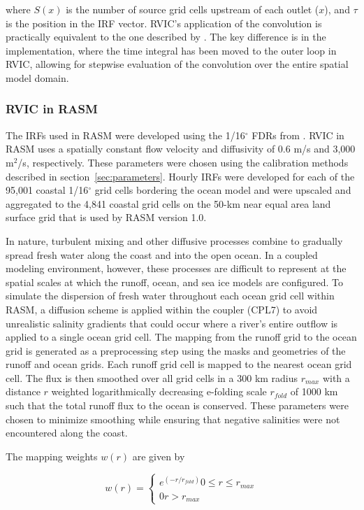 where $S(x)$ is the number of source grid cells upstream of each outlet ($x$), and $\tau$ is the position in the IRF vector.
RVIC's application of the convolution is practically equivalent to the one described by \citet{Lohmann_1996}.
The key difference is in the implementation, where the time integral has been moved to the outer loop in RVIC, allowing for stepwise evaluation of the convolution over the entire spatial model domain.

\subsubsection{RVIC in RASM}

The IRFs used in RASM were developed using the 1/16$^{\circ}$ FDRs from \citet{Wu_2011}.
RVIC in RASM uses a spatially constant flow velocity and diffusivity of 0.6 m/s and 3,000 m$^2$/s, respectively.
These parameters were chosen using the calibration methods described in section~\ref{sec:parameters}.
Hourly IRFs were developed for each of the 95,001 coastal 1/16$^{\circ}$ grid cells bordering the ocean model and were upscaled and aggregated to the 4,841 coastal grid cells on the 50-km near equal area land surface grid that is used by RASM version 1.0.

In nature, turbulent mixing and other diffusive processes combine to gradually spread fresh water along the coast and into the open ocean.
In a coupled modeling environment, however, these processes are difficult to represent at the spatial scales at which the runoff, ocean, and sea ice models are configured.
To simulate the dispersion of fresh water throughout each ocean grid cell within RASM, a diffusion scheme is applied within the coupler (CPL7) to avoid unrealistic salinity gradients that could occur where a river's entire outflow is applied to a single ocean grid cell.
The mapping from the runoff grid to the ocean grid is generated as a preprocessing step using the masks and geometries of the runoff and ocean grids.
Each runoff grid cell is mapped to the nearest ocean grid cell.
The flux is then smoothed over all grid cells in a 300 km radius $r_{max}$ with a distance $r$ weighted logarithmically decreasing e-folding scale $r_{fold}$ of 1000 km such that the total runoff flux to the ocean is conserved.
These parameters were chosen to minimize smoothing while ensuring that negative salinities were not encountered along the coast.

The mapping weights $w(r)$ are given by

\begin{equation}
  \label{eq:diffusion}
  w(r)=
     \begin{cases}
        e^{(-r/r_{fold})} 0\leq r\leq r_{max} \\
        0 r > r_{max}
     \end{cases}
\end{equation}

